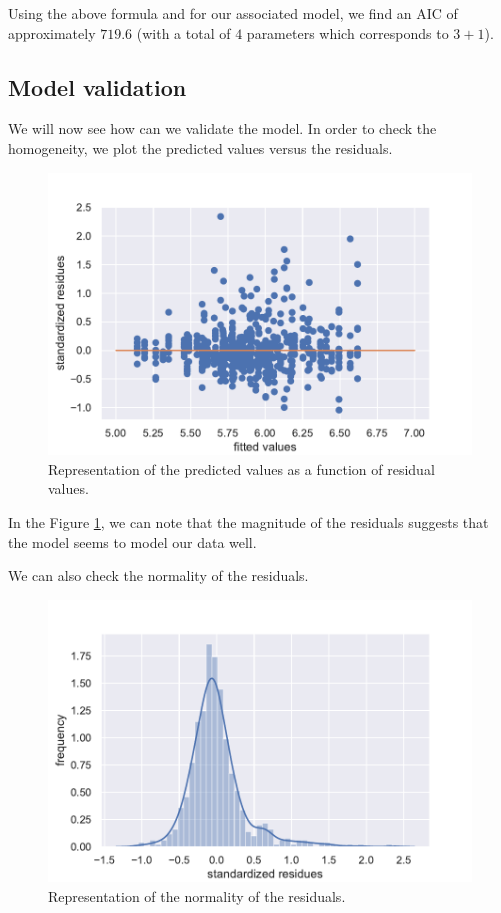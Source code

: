 \documentclass{article}
\begin{document}
Using the above formula and for our associated model, we find an AIC of approximately $719.6$ (with a total of $4$ parameters which corresponds to $3+1$).

\subsection{Model validation}
We will now see how can we validate the model. In order to check the homogeneity, we plot the predicted values versus the residuals.
\begin{figure}[H]
    \centering
    \includegraphics[scale=.65]{./images/homo_mod1.pdf}
    \caption{Representation of the predicted values as a function of 
residual values.}
    \label{fig:homo_mod1}
\end{figure}

In the Figure \ref{fig:homo_mod1}, we can note that the magnitude of the residuals suggests that the model seems to model our data well.

We can also check the normality of the residuals.
\begin{figure}[H]
    \centering
    \includegraphics[scale=.65]{./images/resid_norm.pdf}
    \caption{Representation of the normality of the residuals.}
    \label{fig:resid}
\end{figure}
\end{document}
